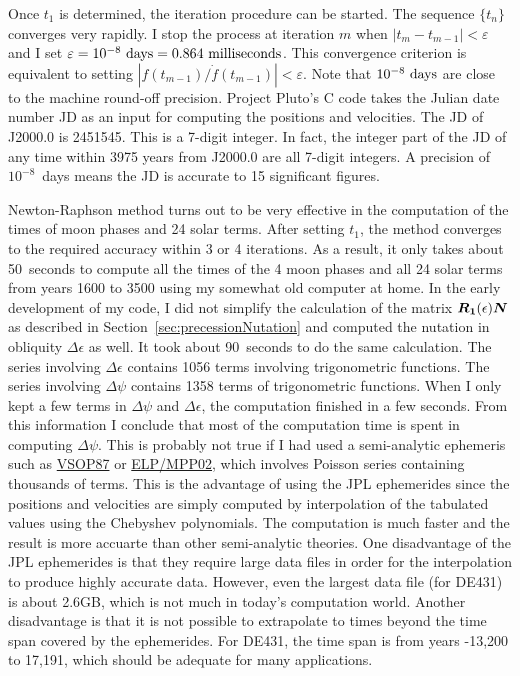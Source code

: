 \documentclass[12pt]{article}
\newcommand{\ve}[1]{\mbox{\boldmath $#1$}}
\begin{document}
\begin{CJK}{UTF8}{bkai}
Once $t_1$ is determined, the iteration procedure can be started. The sequence $\{t_n\}$ 
converges very rapidly. I stop the process at iteration $m$ when $|t_m-t_{m-1}|<\varepsilon$
and I set $\varepsilon=10^{-8}~{\rm days}=0.864~{\rm milliseconds}$. This convergence 
criterion is equivalent to setting $|f(t_{m-1})/\dot{f}(t_{m-1})| < \varepsilon$. 
Note that $10^{-8}~{\rm days}$ are close to the machine round-off precision. 
Project Pluto's C code takes the Julian date number JD as an input for computing 
the positions and velocities. The JD of J2000.0 is 2451545. This is a 7-digit integer. 
In fact, the integer part of the JD of any time within 3975 years from J2000.0 are all 
7-digit integers. 
A precision of $10^{-8}$~days means the JD is accurate to 15 significant figures.

Newton-Raphson method turns out to be very effective in the computation of the times 
of moon phases and 24 solar terms. After setting $t_1$, the method converges to 
the required accuracy within 3 or 4 iterations. As a result, it only takes about 50~seconds 
to compute all the times of the 4 moon phases and all 24 solar terms from years 1600 
to 3500 using my somewhat old computer at home. In the early development of my 
code, I did not simplify the calculation of the matrix $\ve{R_1}(\epsilon)\ve{N}$ 
as described in Section~\ref{sec:precessionNutation} and computed 
the nutation in obliquity $\Delta \epsilon$ 
as well. It took about 90~seconds to do the same calculation. The series involving 
$\Delta \epsilon$ contains 1056 terms involving trigonometric functions. The series 
involving $\Delta \psi$ contains 1358 terms of trigonometric functions. When I 
only kept a few terms in $\Delta \psi$ and $\Delta \epsilon$, the computation 
finished in a few seconds. From this 
information I conclude that most of the computation time is spent in 
computing $\Delta \psi$. This is probably not true if I had used a semi-analytic 
ephemeris such as \href{http://neoprogrammics.com/vsop87/}{VSOP87} or 
\href{http://adsabs.harvard.edu/abs/2003A%26A...404..735C}{ELP/MPP02}, which involves 
Poisson series containing thousands of terms. This is the advantage of using 
the JPL ephemerides since the positions and velocities are simply computed 
by interpolation of the tabulated values using the Chebyshev polynomials. 
The computation is much faster and the result is more accuarte than other 
semi-analytic theories. One disadvantage of the JPL ephemerides is that they 
require large data files in order for the interpolation to produce highly 
accurate data. However, even the largest data file (for DE431) is about 2.6GB, which 
is not much in today's computation world. Another disadvantage is that it is not 
possible to extrapolate to times beyond the time span covered by the ephemerides. 
For DE431, the time span is from years -13,200 to 17,191, which should be adequate 
for many applications.


\end{CJK}
\end{document}
